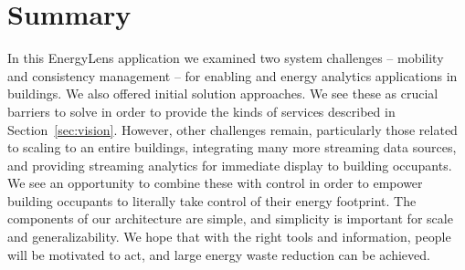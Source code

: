 \section{Summary}


In this EnergyLens application we examined two system challenges -- mobility and consistency management -- for enabling and energy 
analytics applications in buildings.  We also 
offered initial solution approaches.  We
see these as crucial barriers to solve in order to provide the kinds of services described in Section~\ref{sec:vision}.
However, other challenges remain, particularly those related to scaling to an entire buildings, integrating
many more streaming data sources, and providing streaming analytics for immediate display to building occupants.
We see an opportunity to combine these with control in order to empower building occupants to literally take
control of their energy footprint.  The components of our architecture are simple, and simplicity is important for scale and
generalizability.  We hope that with the right tools and information, people will be motivated to act, and large
energy waste reduction can be achieved.